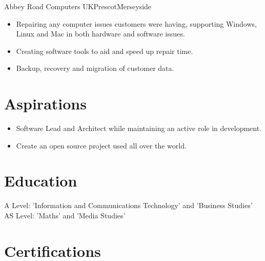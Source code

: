 \documentclass[a4paper,10pt]{moderncv}
\begin{document}
{Abbey Road Computers UK}{Prescot}{Merseyside}{
\begin{itemize}
  \item Repairing any computer issues customers were having, supporting Windows, Linux and Mac in both hardware and software issues.
  \item Creating software tools to aid and speed up repair time.
  \item Backup, recovery and migration of customer data.
\end{itemize}
}

\section{Aspirations}
\begin{itemize}
\item Software Lead and Architect while maintaining an active role in development.
\item Create an open source project used all over the world.
\end{itemize}

\section{Education}
{
A Level: 'Information and Communications Technology' and 'Business Studies'\\
AS Level: 'Maths' and 'Media Studies'
}

\section{Certifications}
\end{document}
